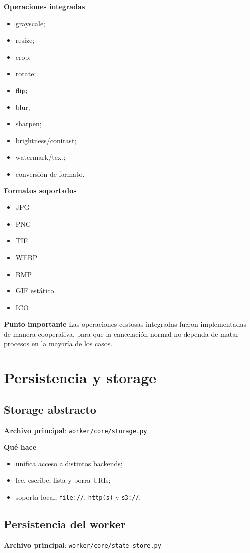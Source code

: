 \documentclass[11pt]{article}
\begin{document}
\textbf{Operaciones integradas}
\begin{itemize}
\item grayscale;
\item resize;
\item crop;
\item rotate;
\item flip;
\item blur;
\item sharpen;
\item brightness/contrast;
\item watermark/text;
\item conversión de formato.
\end{itemize}

\textbf{Formatos soportados}
\begin{itemize}
\item JPG
\item PNG
\item TIF
\item WEBP
\item BMP
\item GIF estático
\item ICO
\end{itemize}

\textbf{Punto importante}
Las operaciones costosas integradas fueron implementadas de manera cooperativa, para que la cancelación normal no dependa de matar procesos en la mayoría de los casos.

\section{Persistencia y storage}

\subsection{Storage abstracto}
\textbf{Archivo principal}: \texttt{worker/core/storage.py}

\textbf{Qué hace}
\begin{itemize}
\item unifica acceso a distintos backends;
\item lee, escribe, lista y borra URIs;
\item soporta local, \texttt{file://}, \texttt{http(s)} y \texttt{s3://}.
\end{itemize}

\subsection{Persistencia del worker}
\textbf{Archivo principal}: \texttt{worker/core/state\_store.py}
\end{document}
